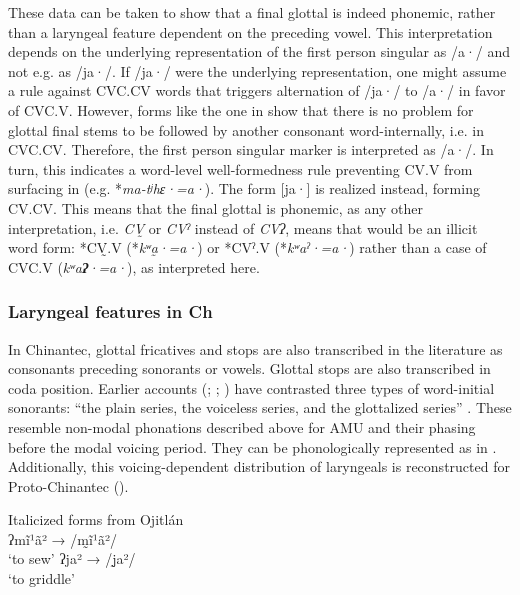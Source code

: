 \documentclass[output=paper]{langscibook}
\begin{document}
These data can be taken to show that a final glottal is indeed phonemic, rather than a laryngeal feature dependent on the preceding vowel. This interpretation depends on the underlying representation of the first person singular as /a·/ and not e.g. as /ja·/. If /ja·/ were the underlying representation, one might assume a rule against CVC.CV words that triggers alternation of /ja·/ to /a·/ in favor of CVC.V. However, forms like the one in  show that there is no problem for glottal final stems to be followed by another consonant word-internally, i.e. in CVC.CV. Therefore, the first person singular marker is interpreted as /a·/. In turn, this indicates a word-level well-formedness rule preventing CV.V from surfacing in  (e.g. *\textit{ma-tʲ}\textit{hɛ·=a·}). The form [ja·] is realized instead, forming CV.CV. This means that the final glottal is phonemic, as any other interpretation, i.e. \textit{CV̰ } or \textit{CVˀ} instead of \textit{CVʔ}, means that  would be an illicit word form: *CV̰.V (*\textit{kʷa̰·=a·}) or *CVˀ.V (*\textit{kʷaˀ·=a·}) rather than a case of CVC.V (\textit{kʷa}\textbf{\textit{ʔ}}\textit{·=a·}), as interpreted here.

\subsubsection{Laryngeal features in Ch}

In Chinantec, glottal fricatives and stops are also transcribed in the literature as consonants preceding sonorants or vowels. Glottal stops are also transcribed in coda position. Earlier accounts (\citealt{Andersen1989}; \citealt{Westley1991}; \citealt{Macaulay1999}) have contrasted three types of word-initial sonorants: “the plain series, the voiceless series, and the glottalized series” \citep[76]{Macaulay1999}. These resemble non-modal phonations described above for AMU and their phasing before the modal voicing period. They can be phonologically represented as in . \label{bkm:Ref133676897}Additionally, this voicing-dependent distribution of laryngeals is reconstructed for Proto\hyp Chinantec (\citealt{Rensch1968,Rensch1989}).

\ea\label{ex:dobui:24}
{Italicized forms from Ojitlán \citep[76]{Macaulay1999}}\\
  ʔmĩ¹ã² → {/m̰ĩ¹ã²/} \\
  ‘to sew’
\z
\ea
  ʔja² → {/j̰a²/} \\
\glt ‘to griddle’
\z
\end{document}
